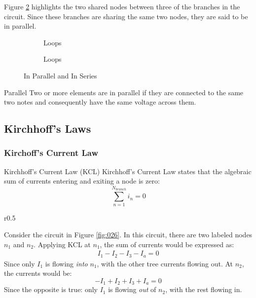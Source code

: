 \documentclass[12pt]{article}
\begin{document}
Figure \ref{fig:010} highlights the two shared nodes between three of the branches in the circuit. Since these branches are sharing the same two nodes, they are said to be in parallel.

\begin{figure}[H]
  \centering
  \begin{subfigure}[H]{0.45\textwidth}
    \centering
    
    \caption{Loops}
    \label{fig:009}
  \end{subfigure}
  \begin{subfigure}[H]{0.45\textwidth}
    \centering
    
    \caption{Loops}
    \label{fig:010}
  \end{subfigure}
  \caption{In Parallel and In Series}
  \label{fig:inParallelAndInSeries}
\end{figure}

\begin{definition}{Parallel}
  Two or more elements are in parallel if they are connected to the same two notes and consequently have the same voltage across them.
\end{definition}

\subsection{Kirchhoff's Laws}
\label{ssec:kirchoffsLaws}

\subsubsection{Kirchoff's Current Law}
\label{sssec:kirchoffsCurrentLaw}

\begin{definition}{Kirchhoff's Current Law (KCL)}
  Kirchhoff's Current Law states that the algebraic sum of currents entering and exiting a node is zero:
  \begin{equation*}
    \sum_{n=1}^{N_{branch}} i_n = 0
  \end{equation*}
\end{definition}

\begin{wrapfigure}[]{r}{0.5\textwidth}
  \vspace{-15pt}
  \centering
  
  \caption{KCL}
  \label{fig:026}
\end{wrapfigure}

Consider the circuit in Figure \ref{fig:026}. In this circuit, there are two labeled nodes $n_1$ and $n_2$. Applying KCL at $n_1$, the sum of currents would be expressed as:
\begin{align*}
  I_1 - I_2 - I_3 - I_a = 0
\end{align*}
Since only $I_1$ is flowing \textit{into} $n_1$, with the other tree currents flowing out. At $n_2$, the currents would be:
\begin{equation*}
  -I_1 + I_2 + I_3 + I_a = 0
\end{equation*}
Since the opposite is true: only $I_1$ is flowing \textit{out} of $n_2$, with the rest flowing in.
\end{document}
